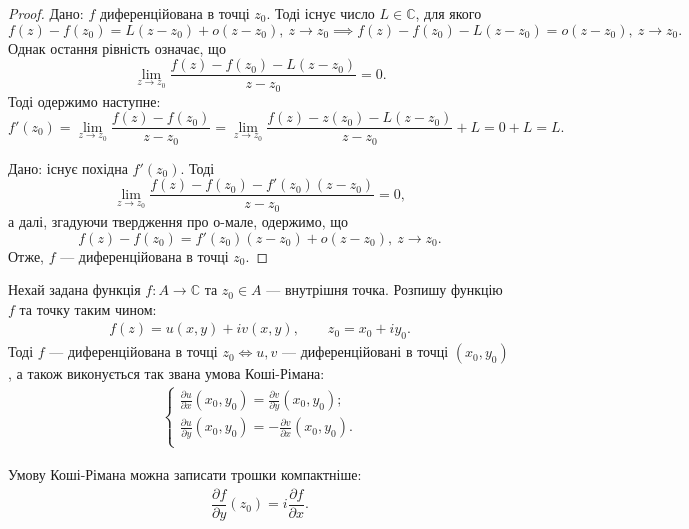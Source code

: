 \documentclass{math_library}
\begin{document}
\begin{proof}
\rightproof Дано: $f$ диференційована в точці $z_0$. Тоді існує число $L \in \mathbb{C}$, для якого
\[
f(z) - f(z_0) = L(z-z_0) + o(z-z_0),\ z \to z_0 \implies f(z) - f(z_0) - L(z-z_0) = o(z-z_0),\ z \to z_0. 
\]
Однак остання рівність означає, що
\[
\lim_{z \to z_0} \dfrac{f(z) - f(z_0) - L(z-z_0)}{z-z_0} = 0.
\]
Тоді одержимо наступне:
\[
f'(z_0) = \lim_{z \to z_0} \dfrac{f(z)-f(z_0)}{z-z_0} = \lim_{z \to z_0} \dfrac{f(z)-z(z_0) - L(z-z_0)}{z-z_0} + L = 0 + L = L.
\]

\leftproof Дано: існує похідна $f'(z_0)$. Тоді
\[
\lim_{z \to z_0} \dfrac{f(z) - f(z_0) - f'(z_0) (z-z_0)}{z-z_0} = 0,
\]
а далі, згадуючи твердження про о-мале, одержимо, що
\[
f(z) - f(z_0) = f'(z_0) (z-z_0) + o(z-z_0),\ z \to z_0.
\] 
Отже, $f$ --- диференційована в точці $z_0$.
\end{proof}

\begin{theorem}
Нехай задана функція $f \colon A \to \mathbb{C}$ та $z_0 \in A$ --- внутрішня точка. Розпишу функцію $f$ та точку таким чином:
\begin{align*}
f(z) = u(x,y) + i v(x,y), \qquad z_0 = x_0 + i y_0.
\end{align*}
Тоді $f$ --- диференційована в точці $z_0 \iff u,v$ --- диференційовані в точці $(x_0,y_0)$, а також виконується так звана умова Коші-Рімана:
\begin{align*}
	\begin{cases}
	\displaystyle\frac{\partial u}{\partial x}(x_0,y_0) = \frac{\partial v}{\partial y}(x_0,y_0);\\
	\displaystyle\frac{\partial u}{\partial y}(x_0,y_0) = -\frac{\partial v}{\partial x}(x_0,y_0).\\
	\end{cases}
	\end{align*}
\end{theorem}

\begin{remark}
Умову Коші-Рімана можна записати трошки компактніше:
\begin{align*}
\dfrac{\partial f}{\partial y}(z_0) = i \dfrac{\partial f}{\partial x}.
\end{align*}
\end{remark}
\end{document}
